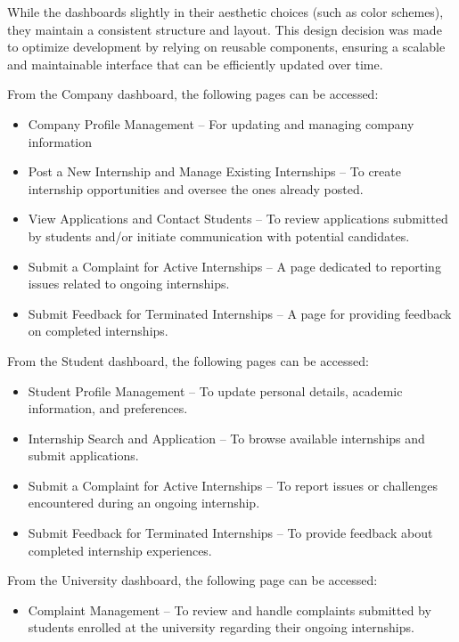 While the dashboards slightly in their aesthetic choices (such as color schemes), they maintain a consistent structure and layout. This design decision was made to optimize development by relying on reusable components, ensuring a scalable and maintainable interface that can be efficiently updated over time.

From the Company dashboard, the following pages can be accessed:
\begin{itemize}
    \item Company Profile Management – For updating and managing company information
    \item Post a New Internship and Manage Existing Internships – To create internship opportunities and oversee the ones already posted.
    \item View Applications and Contact Students – To review applications submitted by students and/or initiate communication with potential candidates.
    \item Submit a Complaint for Active Internships – A page dedicated to reporting issues related to ongoing internships. 
    \item Submit Feedback for Terminated Internships – A page for providing feedback on completed internships.
\end{itemize}

From the Student dashboard, the following pages can be accessed:
\begin{itemize}
    \item Student Profile Management – To update personal details, academic information, and preferences.
    \item Internship Search and Application – To browse available internships and submit applications.
    \item Submit a Complaint for Active Internships – To report issues or challenges encountered during an ongoing internship.
    \item Submit Feedback for Terminated Internships – To provide feedback about completed internship experiences.
\end{itemize}

From the University dashboard, the following page can be accessed:
\begin{itemize}
    \item Complaint Management – To review and handle complaints submitted by students enrolled at the university regarding their ongoing internships.
\end{itemize}

